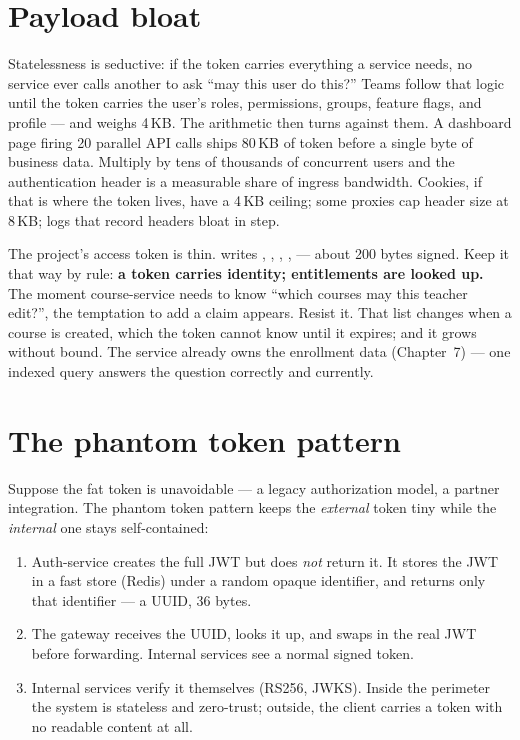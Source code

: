 \section{Payload bloat}
\label{sec:payload-bloat}

Statelessness is seductive: if the token carries everything a service
needs, no service ever calls another to ask ``may this user do this?''
Teams follow that logic until the token carries the user's roles,
permissions, groups, feature flags, and profile --- and weighs 4\,KB. The
arithmetic then turns against them. A dashboard page firing 20 parallel
API calls ships 80\,KB of token before a single byte of business data.
Multiply by tens of thousands of concurrent users and the authentication
header is a measurable share of ingress bandwidth. Cookies, if that is
where the token lives, have a 4\,KB ceiling; some proxies cap header size
at 8\,KB; logs that record headers bloat in step.

The project's access token is thin. 
writes , , , ,  ---
about 200 bytes signed. Keep it that way by rule: \textbf{a token carries
identity; entitlements are looked up.} The moment course-service needs to
know ``which courses may this teacher edit?'', the temptation to add a
 claim appears. Resist it. That list changes when a
course is created, which the token cannot know until it expires; and it
grows without bound. The service already owns the enrollment data
(Chapter~7) --- one indexed query answers the question correctly and
currently.

\section{The phantom token pattern}

Suppose the fat token is unavoidable --- a legacy authorization model, a
partner integration. The phantom token pattern keeps the \emph{external}
token tiny while the \emph{internal} one stays self-contained:

\begin{enumerate}
  \item Auth-service creates the full JWT but does \emph{not} return it.
  It stores the JWT in a fast store (Redis) under a random opaque
  identifier, and returns only that identifier --- a UUID, 36 bytes.
  \item The gateway receives the UUID, looks it up, and swaps in the real
  JWT before forwarding. Internal services see a normal signed token.
  \item Internal services verify it themselves (RS256, JWKS). Inside the
  perimeter the system is stateless and zero-trust; outside, the client
  carries a token with no readable content at all.
\end{enumerate}

